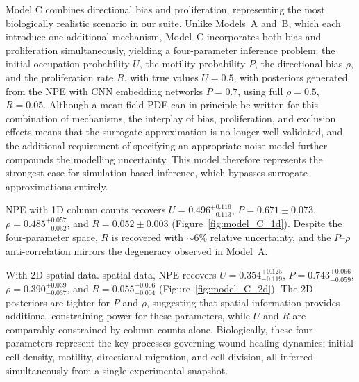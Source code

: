 \documentclass{article}
\providecommand{\DIFaddtex}[1]{{\protect\color{blue} \sf #1}} %
\providecommand{\DIFdeltex}[1]{{\protect\color{red} \scriptsize #1}} %
\providecommand{\DIFaddbegin}{} %
\providecommand{\DIFaddend}{} %
\providecommand{\DIFdelbegin}{} %
\providecommand{\DIFdelend}{} %
\providecommand{\DIFadd}[1]{\texorpdfstring{\DIFaddtex{#1}}{#1}} %
\providecommand{\DIFdel}[1]{\texorpdfstring{\DIFdeltex{#1}}{}} %
\newcommand{\DIFscaledelfig}{0.5}
\newlength{\DIFdelgraphicswidth} %
\newlength{\DIFdelgraphicsheight} %
\newcommand{\DIFaddincludegraphics}[2][]{{\color{blue}\fbox{\DIFOincludegraphics[#1]{#2}}}} %
\newcommand{\DIFdelincludegraphics}[2][]{%
\sbox{\DIFdelgraphicsbox}{\DIFOincludegraphics[#1]{#2}}%
\settoboxwidth{\DIFdelgraphicswidth}{\DIFdelgraphicsbox} %
\settoboxtotalheight{\DIFdelgraphicsheight}{\DIFdelgraphicsbox} %
\scalebox{\DIFscaledelfig}{%
\parbox[b]{\DIFdelgraphicswidth}{\usebox{\DIFdelgraphicsbox}\\[-\baselineskip] \rule{\DIFdelgraphicswidth}{0em}}\llap{\resizebox{\DIFdelgraphicswidth}{\DIFdelgraphicsheight}{%
\setlength{\unitlength}{\DIFdelgraphicswidth}%
\begin{picture}(1,1)%
\thicklines\linethickness{2pt} %
{\color[rgb]{1,0,0}\put(0,0){\framebox(1,1){}}}%
{\color[rgb]{1,0,0}\put(0,0){\line( 1,1){1}}}%
{\color[rgb]{1,0,0}\put(0,1){\line(1,-1){1}}}%
\end{picture}%
}\hspace*{3pt}}} %
} %
\DeclareRobustCommand{\DIFaddbegin}{\DIFOaddbegin \let\includegraphics\DIFaddincludegraphics} %
\DeclareRobustCommand{\DIFaddend}{\DIFOaddend \let\includegraphics\DIFOincludegraphics} %
\DeclareRobustCommand{\DIFdelbegin}{\DIFOdelbegin \let\includegraphics\DIFdelincludegraphics} %
\DeclareRobustCommand{\DIFdelend}{\DIFOaddend \let\includegraphics\DIFOincludegraphics} %
\begin{document}
\DIFadd{Model C combines directional bias and proliferation, representing the most biologically realistic scenario in our suite. Unlike Models~A and~B, which each introduce one additional mechanism, Model~C incorporates both bias and proliferation simultaneously, yielding a four-parameter inference problem: the initial occupation probability $U$, the motility probability $P$, the directional bias $\rho$, and the proliferation rate $R$, with true values $U = 0.5$}\DIFaddend , \DIFdelbegin \DIFdel{with posteriors generated from the NPE with CNN embedding networks}\DIFdelend \DIFaddbegin \DIFadd{$P = 0.7$}\DIFaddend , \DIFdelbegin \DIFdel{using full }\DIFdelend \DIFaddbegin \DIFadd{$\rho = 0.5$, $R = 0.05$. Although a mean-field PDE can in principle be written for this combination of mechanisms, the interplay of bias, proliferation, and exclusion effects means that the surrogate approximation is no longer well validated, and the additional requirement of specifying an appropriate noise model further compounds the modelling uncertainty. This model therefore represents the strongest case for simulation-based inference, which bypasses surrogate approximations entirely.
}

\DIFadd{NPE with 1D column counts recovers $U = 0.496^{+0.116}_{-0.113}$, $P = 0.671 \pm 0.073$, $\rho = 0.485^{+0.057}_{-0.052}$, and $R = 0.052 \pm 0.003$ (Figure~\ref{fig:model_C_1d}). Despite the four-parameter space, $R$ is recovered with ${\sim}6\%$ relative uncertainty, and the $P$--$\rho$ anti-correlation mirrors the degeneracy observed in Model~A.
}

\DIFadd{With }\DIFaddend 2D \DIFdelbegin \DIFdel{spatial data.}%
\DIFdelend \DIFaddbegin \DIFadd{spatial data, NPE recovers $U = 0.354^{+0.125}_{-0.119}$, $P = 0.743^{+0.066}_{-0.059}$, $\rho = 0.390^{+0.039}_{-0.037}$, and $R = 0.055^{+0.006}_{-0.004}$ (Figure~\ref{fig:model_C_2d}). The 2D posteriors are tighter for $P$ and $\rho$, suggesting that spatial information provides additional constraining power for these parameters, while $U$ and $R$ are comparably constrained by column counts alone. Biologically, these four parameters represent the key processes governing wound healing dynamics: initial cell density, motility, directional migration, and cell division, all inferred simultaneously from a single experimental snapshot.
}\DIFaddend 
\end{document}
